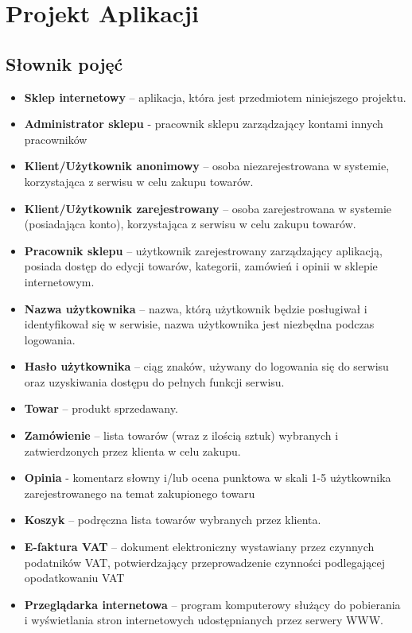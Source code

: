 \documentclass[10pt,a4paper]{article}
\begin{document}
  \section{Projekt Aplikacji}
    \subsection{Słownik pojęć}
        \begin{itemize}
		  \item \textbf{Sklep internetowy} – aplikacja, która jest przedmiotem niniejszego projektu.
		  \item \textbf{Administrator sklepu} - pracownik sklepu zarządzający kontami innych pracowników
          \item \textbf{Klient/Użytkownik anonimowy} – osoba niezarejestrowana w systemie,
           	    		korzystająca z serwisu w celu zakupu towarów.
		  \item \textbf{Klient/Użytkownik zarejestrowany} – osoba zarejestrowana w systemie (posiadająca konto),
		  				korzystająca z serwisu w celu zakupu towarów.
		  \item \textbf{Pracownik sklepu} – użytkownik zarejestrowany zarządzający aplikacją, posiada dostęp do edycji 									towarów, kategorii, zamówień i opinii w sklepie internetowym.
		  \item \textbf{Nazwa użytkownika} – nazwa, którą użytkownik będzie posługiwał i identyfikował się w serwisie,
		  	    		nazwa użytkownika jest niezbędna podczas logowania.
		  \item \textbf{Hasło użytkownika} – ciąg znaków, używany do logowania się do serwisu oraz uzyskiwania dostępu 
		  				do pełnych funkcji serwisu.
		  \item \textbf{Towar} – produkt sprzedawany.
		  \item \textbf{Zamówienie} – lista towarów (wraz z ilością sztuk) wybranych i zatwierdzonych przez 
		  				klienta w celu zakupu.
		  \item \textbf{Opinia} - komentarz słowny i/lub ocena punktowa w skali 1-5 użytkownika zarejestrowanego 
		  				na temat zakupionego towaru
		  \item \textbf{Koszyk} – podręczna lista towarów wybranych przez klienta.
		  \item \textbf{E-faktura VAT} – dokument elektroniczny wystawiany przez czynnych podatników VAT, 
		  				potwierdzający przeprowadzenie czynności podlegającej opodatkowaniu VAT
		  \item \textbf{Przeglądarka internetowa} – program komputerowy służący do pobierania i 
		  	    		wyświetlania stron internetowych udostępnianych przez serwery WWW.
		\end{itemize}
	  \newpage
\end{document}
